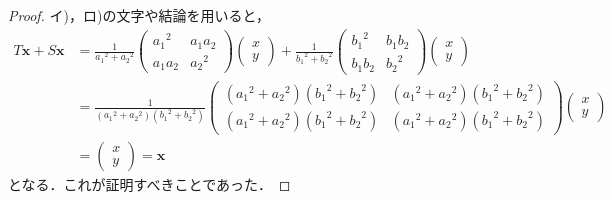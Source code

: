 \documentclass[dvipdfmx,uplatex,11pt]{jsarticle}
\theoremstyle{definition}
\begin{document}
\begin{leftbar}
    \begin{proof}
    イ)，ロ)の文字や結論を用いると，
        \begin{align*}
        T \bm{x} + S \bm{x} & =
        \frac{1}{{a_1}^2+{a_2}^2}
        \begin{pmatrix}
            {a_1}^2 & a_1 a_2 \\
            a_1 a_2 & {a_2}^2
        \end{pmatrix}
        \begin{pmatrix}
            x \\
            y
        \end{pmatrix}
        +
        \frac{1}{{b_1}^2+{b_2}^2}
        \begin{pmatrix}
            {b_1}^2 & b_1 b_2 \\
            b_1 b_2 & {b_2}^2
        \end{pmatrix}
        \begin{pmatrix}
            x \\
            y
        \end{pmatrix}
        \\
        & = \frac{1}{({a_1}^2+{a_2}^2)({b_1}^2+{b_2}^2)}
        \begin{pmatrix}
            ({a_1}^2+{a_2}^2)({b_1}^2+{b_2}^2) & ({a_1}^2+{a_2}^2)({b_1}^2+{b_2}^2) \\
            ({a_1}^2+{a_2}^2)({b_1}^2+{b_2}^2) & ({a_1}^2+{a_2}^2)({b_1}^2+{b_2}^2)
        \end{pmatrix}
        \begin{pmatrix}
            x \\
            y
        \end{pmatrix}
        \\
        & =\begin{pmatrix}
            x \\
            y
        \end{pmatrix}
        =\bm{x}
    \end{align*}
    となる．これが証明すべきことであった．
\end{proof}
\end{leftbar}
%
\end{document}
